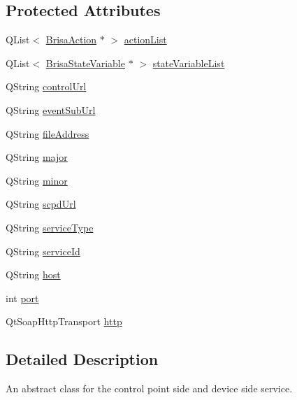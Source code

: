 \subsection*{Protected Attributes}
\begin{DoxyCompactItemize}
\item 
QList$<$ \hyperlink{classBrisaUpnp_1_1BrisaAction}{BrisaAction} $\ast$ $>$ \hyperlink{classBrisaUpnp_1_1BrisaAbstractService_a58ee35d99146f1f3055dc4a0abfe7282}{actionList}
\item 
QList$<$ \hyperlink{classBrisaUpnp_1_1BrisaStateVariable}{BrisaStateVariable} $\ast$ $>$ \hyperlink{classBrisaUpnp_1_1BrisaAbstractService_a2c7ed42464b85970271105ca2c95417e}{stateVariableList}
\item 
QString \hyperlink{classBrisaUpnp_1_1BrisaAbstractService_acc5a45e07d8da5d8e086b02f4a22cc78}{controlUrl}
\item 
QString \hyperlink{classBrisaUpnp_1_1BrisaAbstractService_a81d2525c94d2b9572c962089c388f8f9}{eventSubUrl}
\item 
QString \hyperlink{classBrisaUpnp_1_1BrisaAbstractService_a43e52fe6edbf817dd1aa7685ce9e8e92}{fileAddress}
\item 
QString \hyperlink{classBrisaUpnp_1_1BrisaAbstractService_a1301aa0d68ee3b45dc4158a17d3ab2e9}{major}
\item 
QString \hyperlink{classBrisaUpnp_1_1BrisaAbstractService_a5fedbc9b380612c7c4062b2e25ed3a1c}{minor}
\item 
QString \hyperlink{classBrisaUpnp_1_1BrisaAbstractService_aa254b466f38b49b921ed7a25aea7cc8c}{scpdUrl}
\item 
QString \hyperlink{classBrisaUpnp_1_1BrisaAbstractService_a670933cc6c8581e2f70f52a97d425e4c}{serviceType}
\item 
QString \hyperlink{classBrisaUpnp_1_1BrisaAbstractService_ad72b169651a6c617d27d51e7f706410d}{serviceId}
\item 
QString \hyperlink{classBrisaUpnp_1_1BrisaAbstractService_a9033d7f9255f3a1b6d3540258bf2ade1}{host}
\item 
int \hyperlink{classBrisaUpnp_1_1BrisaAbstractService_a12d4aea82a4296760ba3f7a27ace68e6}{port}
\item 
QtSoapHttpTransport \hyperlink{classBrisaUpnp_1_1BrisaAbstractService_a416381a60d5ea6dc4ee694272f91aebc}{http}
\end{DoxyCompactItemize}


\subsection{Detailed Description}
An abstract class for the control point side and device side service. 

